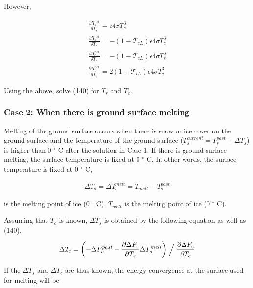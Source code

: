 However,

\begin{eqnarray}
 \frac{\partial R^{net}_s}{\partial T_s} =
 \epsilon 4 \sigma T_s^3 \\
 \frac{\partial R^{net}_s}{\partial T_c} =
 - ( 1 - {\mathcal{T}}_{cL} ) \epsilon 4 \sigma T_c^3 \\
 \frac{\partial R^{net}_c}{\partial T_s} =
 - ( 1 - {\mathcal{T}}_{cL} ) \epsilon 4 \sigma T_s^3 \\
 \frac{\partial R^{net}_c}{\partial T_c} =
  2( 1 - {\mathcal{T}}_{cL} ) \epsilon 4 \sigma T_c^3
\end{eqnarray}

Using the above, solve (140) for \(T_s\) and \(T_c\).

\hypertarget{case-2-when-there-is-ground-surface-melting}{%
\subsubsection{Case 2: When there is ground surface
melting}\label{case-2-when-there-is-ground-surface-melting}}

Melting of the ground surface occurs when there is snow or ice cover on
the ground surface and the temperature of the ground surface
(\(T_s^{current} = T_s^{past}+\Delta T_s\)) is higher than 0
\(^{\circ}\) C after the solution in Case 1. If there is ground surface
melting, the surface temperature is fixed at 0 \(^{\circ}\) C. In other
words, the surface temperature is fixed at 0 \(^{\circ}\) C,

\begin{eqnarray}
 \Delta T_s = \Delta T_s^{melt} = T_{melt} - T_s^{past}
\end{eqnarray}

is the melting point of ice (0 \(^{\circ}\) C). \(T_{melt}\) is the
melting point of ice (0 \(^{\circ}\) C).

Assuming that \(T_c\) is known, \(\Delta T_s\) is obtained by the
following equation as well as (140).

\begin{eqnarray}
 \Delta T_c = \left( - \Delta F_c^{past}
            - \frac{\partial \Delta F_c}{\partial T_s} \Delta T_s^{melt}
              \right) \Bigm/ \frac{\partial \Delta F_c}{\partial T_c}
\end{eqnarray}

If the \(\Delta T_s\) and \(\Delta T_c\) are thus known, the energy
convergence at the surface used for melting will be

